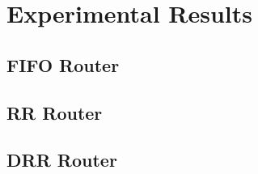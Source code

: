 
\section{Experimental Results}

\subsection{FIFO Router}

\subsection{RR Router}

\subsection{DRR Router}